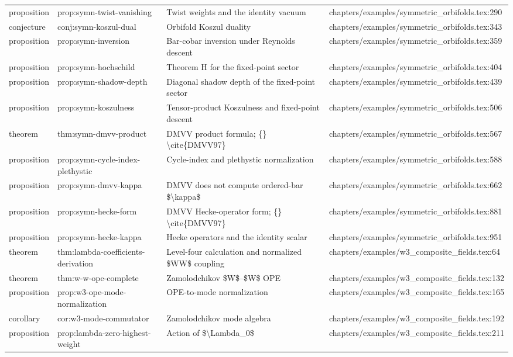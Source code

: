 \documentclass[11pt]{article}
\begin{document}
\begin{longtable}{L{0.10\textwidth}L{0.26\textwidth}L{0.42\textwidth}L{0.22\textwidth}}
proposition & prop:symn-twist-vanishing & Twist weights and the identity vacuum & chapters/examples/symmetric\_orbifolds.tex:290\\
conjecture & conj:symn-koszul-dual & Orbifold Koszul duality & chapters/examples/symmetric\_orbifolds.tex:343\\
proposition & prop:symn-inversion & Bar-cobar inversion under Reynolds descent & chapters/examples/symmetric\_orbifolds.tex:359\\
proposition & prop:symn-hochschild & Theorem H for the fixed-point sector & chapters/examples/symmetric\_orbifolds.tex:404\\
proposition & prop:symn-shadow-depth & Diagonal shadow depth of the fixed-point sector & chapters/examples/symmetric\_orbifolds.tex:439\\
proposition & prop:symn-koszulness & Tensor-product Koszulness and fixed-point descent & chapters/examples/symmetric\_orbifolds.tex:506\\
theorem & thm:symn-dmvv-product & DMVV product formula; \{\} \textbackslash{}cite\{DMVV97\} & chapters/examples/symmetric\_orbifolds.tex:567\\
proposition & prop:symn-cycle-index-plethystic & Cycle-index and plethystic normalization & chapters/examples/symmetric\_orbifolds.tex:588\\
proposition & prop:symn-dmvv-kappa & DMVV does not compute ordered-bar \$\textbackslash{}kappa\$ & chapters/examples/symmetric\_orbifolds.tex:662\\
proposition & prop:symn-hecke-form & DMVV Hecke-operator form; \{\} \textbackslash{}cite\{DMVV97\} & chapters/examples/symmetric\_orbifolds.tex:881\\
proposition & prop:symn-hecke-kappa & Hecke operators and the identity scalar & chapters/examples/symmetric\_orbifolds.tex:951\\
theorem & thm:lambda-coefficients-derivation & Level-four calculation and normalized \$WW\$ coupling & chapters/examples/w3\_composite\_fields.tex:64\\
theorem & thm:w-w-ope-complete & Zamolodchikov \$W\$--\$W\$ OPE & chapters/examples/w3\_composite\_fields.tex:132\\
proposition & prop:w3-ope-mode-normalization & OPE-to-mode normalization & chapters/examples/w3\_composite\_fields.tex:165\\
corollary & cor:w3-mode-commutator & Zamolodchikov mode algebra & chapters/examples/w3\_composite\_fields.tex:192\\
proposition & prop:lambda-zero-highest-weight & Action of \$\textbackslash{}Lambda\_0\$ & chapters/examples/w3\_composite\_fields.tex:211\\

\end{longtable}
\end{document}
